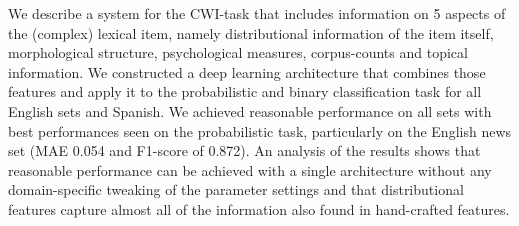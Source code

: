 We describe a system for the CWI-task that includes information on 5 aspects of the (complex) lexical item, namely distributional information of the item itself, morphological structure, psychological measures, corpus-counts and topical information. We constructed a deep learning architecture that combines those features and apply it to the probabilistic and binary classification task for all English sets and Spanish. We achieved reasonable performance on all sets with best performances seen on the probabilistic task, particularly on the English news set (MAE 0.054 and F1-score of 0.872). An analysis of the results shows that reasonable performance can be achieved with a single architecture without any domain-specific tweaking of the parameter settings and that distributional features capture almost all of the information also found in hand-crafted features.
